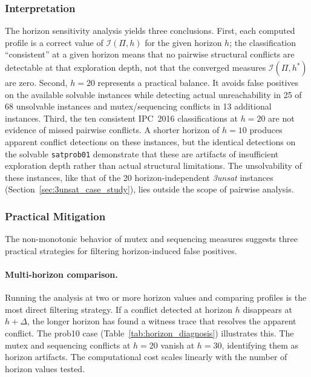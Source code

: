 \subsubsection{Interpretation}

The horizon sensitivity analysis yields three conclusions. First, each computed profile is a correct value of $\mathcal{I}(\Pi, h)$ for the given horizon $h$; the classification ``consistent'' at a given horizon means that no pairwise structural conflicts are detectable at that exploration depth, not that the converged measures $\mathcal{I}(\Pi, h^*)$ are zero. Second, $h = 20$ represents a practical balance. It avoids false positives on the available solvable instances while detecting actual unreachability in 25 of 68 unsolvable instances and mutex/sequencing conflicts in 13 additional instances. Third, the ten consistent \ac{IPC}~2016 classifications at $h = 20$ are not evidence of missed pairwise conflicts. A shorter horizon of $h = 10$ produces apparent conflict detections on these instances, but the identical detections on the solvable \texttt{satprob01} demonstrate that these are artifacts of insufficient exploration depth rather than actual structural limitations. The unsolvability of these instances, like that of the 20 horizon-independent \textit{3unsat} instances (Section~\ref{sec:3unsat_case_study}), lies outside the scope of pairwise analysis.

\subsubsection{Practical Mitigation}

The non-monotonic behavior of mutex and sequencing measures suggests three practical strategies for filtering horizon-induced false positives.

\paragraph{Multi-horizon comparison.} Running the analysis at two or more horizon values and comparing profiles is the most direct filtering strategy. If a conflict detected at horizon $h$ disappears at $h + \Delta$, the longer horizon has found a witness trace that resolves the apparent conflict. The prob10 case (Table~\ref{tab:horizon_diagnosis}) illustrates this. The mutex and sequencing conflicts at $h = 20$ vanish at $h = 30$, identifying them as horizon artifacts. The computational cost scales linearly with the number of horizon values tested.

